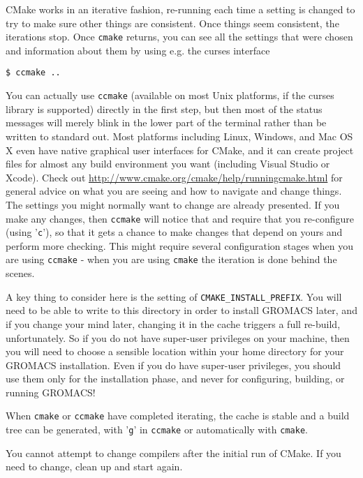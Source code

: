 \documentclass{article}[12pt,a4paper,twoside]
\newcommand{\gromacs}{GROMACS}
\newcommand{\cmake}{CMake}
\begin{document}
\cmake{} works in an iterative fashion, re-running each time a setting
is changed to try to make sure other things are consistent. Once
things seem consistent, the iterations stop. Once \verb+cmake+
returns, you can see all the settings that were chosen and information
about them by using e.g. the curses interface
\begin{verbatim}
$ ccmake ..
\end{verbatim}
You can actually use \verb+ccmake+ (available on most Unix platforms,
if the curses library is supported) directly in the first step, but then
most of the status messages will merely blink in the lower part
of the terminal rather than be written to standard out. Most platforms
including Linux, Windows, and Mac OS X even have native graphical user interfaces for
\cmake{}, and it can create project files for almost any build environment
you want (including Visual Studio or Xcode).
Check out \url{http://www.cmake.org/cmake/help/runningcmake.html} for
general advice on what you are seeing and how to navigate and change
things. The settings you might normally want to change are already
presented. If you make any changes, then \verb+ccmake+ will notice
that and require that you re-configure (using '\verb+c+'), so that it
gets a chance to make changes that depend on yours and perform more
checking. This might require several configuration stages when you are
using \verb+ccmake+ - when you are using \verb+cmake+ the
iteration is done behind the scenes.

A key thing to consider here is the setting of
\verb+CMAKE_INSTALL_PREFIX+. You will need to be able to write to this
directory in order to install \gromacs{} later, and if you change your
mind later, changing it in the cache triggers a full re-build,
unfortunately. So if you do not have super-user privileges on your
machine, then you will need to choose a sensible location within your
home directory for your \gromacs{} installation. Even if you do have
super-user privileges, you should use them only for the installation
phase, and never for configuring, building, or running \gromacs{}!

When \verb+cmake+ or \verb+ccmake+ have completed iterating, the
cache is stable and a build tree can be generated, with '\verb+g+' in
\verb+ccmake+ or automatically with \verb+cmake+.

You cannot attempt to change compilers after the initial run of
\cmake{}. If you need to change, clean up and start again.
\end{document}
